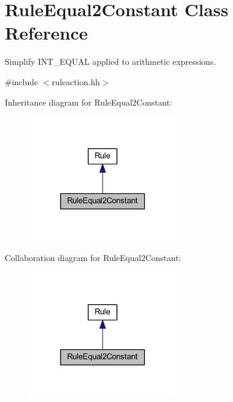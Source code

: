 \hypertarget{class_rule_equal2_constant}{}\section{Rule\+Equal2\+Constant Class Reference}
\label{class_rule_equal2_constant}


Simplify I\+N\+T\+\_\+\+E\+Q\+U\+AL applied to arithmetic expressions.  




{\ttfamily \#include $<$ruleaction.\+hh$>$}



Inheritance diagram for Rule\+Equal2\+Constant\+:
\nopagebreak
\begin{figure}[H]
\begin{center}
\leavevmode
\includegraphics[width=185pt]{class_rule_equal2_constant__inherit__graph}
\end{center}
\end{figure}


Collaboration diagram for Rule\+Equal2\+Constant\+:
\nopagebreak
\begin{figure}[H]
\begin{center}
\leavevmode
\includegraphics[width=185pt]{class_rule_equal2_constant__coll__graph}
\end{center}
\end{figure}
